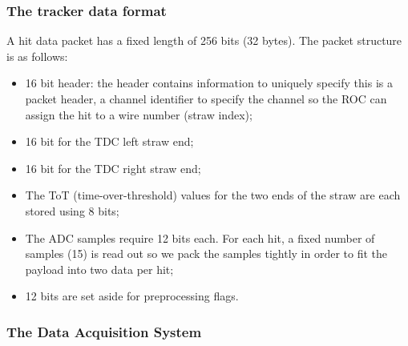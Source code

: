 \subsubsection{The tracker data format}
A hit data packet has
a fixed length of 256 bits (32 bytes).
The packet structure is as follows:
\begin{itemize}
    \item 16 bit header: the header contains information to uniquely specify this is a
    packet header, a channel identifier to specify the channel so the ROC can
    assign the hit to a wire number (straw index);
    \item 16 bit for the TDC left straw end;
    \item 16 bit for the TDC right straw end;
    \item The ToT (time-over-threshold) values for the two ends 
    of the straw are each stored using 8 bits;
    \item The ADC samples require 12 bits each. For each hit, a fixed number of 
    samples (15) is read out so we
    pack the samples tightly in order to fit the payload into two data per hit;
    \item 12 bits are set aside for preprocessing flags.
\end{itemize}

\subsubsection{The Data Acquisition System}\label{tdaqtra}


